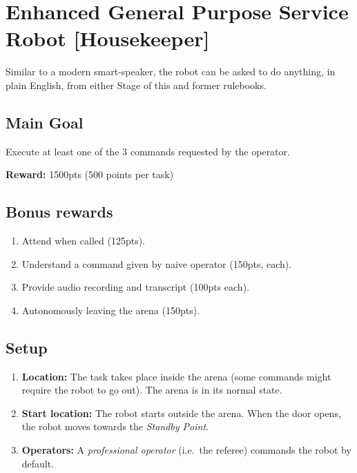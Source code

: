 \section{Enhanced General Purpose Service Robot [Housekeeper]}
\label{test:egpsr}
Similar to a modern smart-speaker, the robot can be asked to do anything, in plain English, from either Stage of this and former rulebooks.


\subsection*{Main Goal}
Execute at least one of the 3 commands requested by the operator.

\noindent\textbf{Reward:} 1500pts (500 points per task)\\

\subsection*{Bonus rewards}
\begin{enumerate}[nosep]
	\item Attend when called (125pts).
	\item Understand a command given by naive operator (150pts, each).
	\item Provide audio recording and transcript (100pts each).
	\item Autonomously leaving the arena (150pts).
\end{enumerate}

%
%
\subsection*{Setup}
\begin{enumerate}
	\item \textbf{Location:} The task takes place inside the arena (some commands might require the robot to go out). The arena is in its normal state.

	\item \textbf{Start location:} The robot starts outside the arena. When the door opens, the robot moves towards the \textit{Standby Point}.

	\item \textbf{Operators:} A \emph{professional operator} (i.e.~the referee) commands the robot by default.
\end{enumerate}

